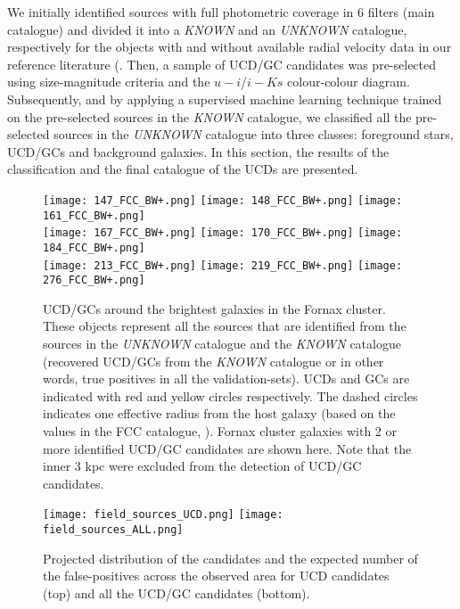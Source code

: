 \documentclass[fleqn,usenatbib]{mnras}
\begin{document}
We initially identified sources with full photometric coverage in 6 filters (main catalogue) and divided it into a \textit{KNOWN} and an \textit{UNKNOWN} catalogue, respectively for the objects with and without available radial velocity data in our reference literature (\citealp{wittmann-2016,Pota-2018,Maddox-2019}. Then, a sample of UCD/GC candidates was pre-selected using size-magnitude criteria and the $u-i$/$i-Ks$ colour-colour diagram. Subsequently, and by applying a supervised machine learning technique trained on the pre-selected sources in the \textit{KNOWN} catalogue, we classified all the pre-selected sources in the \textit{UNKNOWN} catalogue into three classes: foreground stars, UCD/GCs and background galaxies. In this section, the results of the classification and the final catalogue of the UCDs are presented.
\begin{figure*}
        \texttt{[image: 147\_FCC\_BW+.png]}
        \texttt{[image: 148\_FCC\_BW+.png]}
        \texttt{[image: 161\_FCC\_BW+.png]}
        \\
        \texttt{[image: 167\_FCC\_BW+.png]}
        \texttt{[image: 170\_FCC\_BW+.png]}
        \texttt{[image: 184\_FCC\_BW+.png]}
        \\
        \texttt{[image: 213\_FCC\_BW+.png]}
        \texttt{[image: 219\_FCC\_BW+.png]}
        \texttt{[image: 276\_FCC\_BW+.png]}
        
\caption{UCD/GCs around the brightest galaxies in the Fornax cluster. These objects represent all the sources that are identified from the sources in the \textit{UNKNOWN} catalogue and the \textit{KNOWN} catalogue (recovered UCD/GCs from the \textit{KNOWN} catalogue or in other words, true positives in all the validation-sets). UCDs and GCs are indicated with red and yellow circles respectively. The dashed circles indicates one effective radius from the host galaxy (based on the values in the FCC catalogue, \citealp{fcc}). Fornax cluster galaxies with 2 or more identified UCD/GC candidates are shown here. Note that the inner 3 kpc were excluded from the detection of UCD/GC candidates.}
\label{gcsaround}
\end{figure*}

\begin{figure}
        \texttt{[image: field\_sources\_UCD.png]}
        \texttt{[image: field\_sources\_ALL.png]}
\caption{Projected distribution of the candidates and the expected number of the false-positives across the observed area for UCD candidates (top) and all the UCD/GC candidates (bottom).}
\label{fieldsources}
\end{figure}
\end{document}
